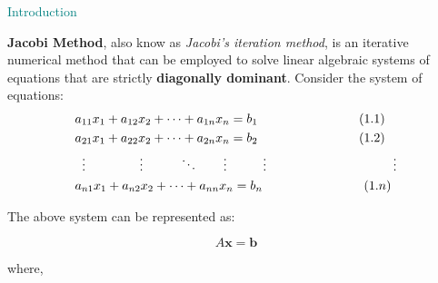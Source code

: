 \documentclass[main]{subfiles}
\begin{document}
    {\Huge \textcolor{teal}{Introduction}\\}

    \textbf{Jacobi Method}, also know as \textit{Jacobi's iteration method}, is an iterative numerical 
    method that can be employed to solve linear algebraic systems of equations that are strictly \textbf{diagonally dominant}.
    Consider the system of equations:
    \\        


    \begin{align*}\label{eq1}
        &a_{11}x_1 + a_{12}x_2 + \cdots + a_{1n}x_n = b_1 \quad\quad\quad\quad\quad\quad\quad\quad(1.1)\\
        &a_{21}x_1 + a_{22}x_2 + \cdots + a_{2n}x_n = b_2  \quad\quad\quad\quad\quad\quad\quad\quad(1.2)\\
        &\;\;\vdots \hspace{15mm} \vdots \hspace{10mm} \ddots \hspace{7mm} \vdots \hspace{10mm} \vdots\quad\quad\quad\quad\quad\quad\quad\quad\quad\quad\vdots \\
        &a_{n1}x_1 + a_{n2}x_2 + \cdots + a_{nn}x_n = b_n \quad\quad\quad\quad\quad\quad\quad\quad(1.n)
    \end{align*}


    \vspace{19mm}  

    The above system can be represented as:

    \begin{equation}
        A\textbf{x} = \textbf{b}
    \end{equation}
    \vspace{10mm}
    
    where, 
\end{document}
